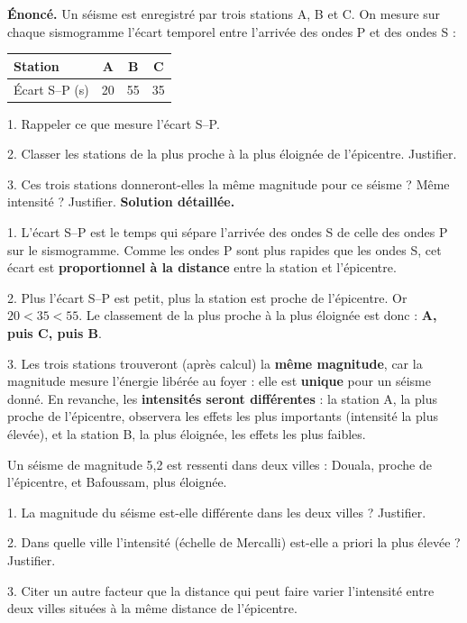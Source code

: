 \documentclass[11pt]{article}
\begin{document}
\begin{exoresolu}
\textbf{Énoncé.} Un séisme est enregistré par trois stations A, B et C. On mesure sur chaque sismogramme l'écart temporel entre l'arrivée des ondes P et des ondes S :
\begin{center}
\begin{tabular}{|l|c|c|c|}
\hline
\rowcolor{popblueL} \textbf{Station} & A & B & C \\
\hline
Écart S--P (s) & 20 & 55 & 35 \\
\hline
\end{tabular}
\end{center}
1. Rappeler ce que mesure l'écart S--P.\par
2. Classer les stations de la plus proche à la plus éloignée de l'épicentre. Justifier.\par
3. Ces trois stations donneront-elles la même magnitude pour ce séisme ? Même intensité ? Justifier.
\tcblower
\textbf{Solution détaillée.}\par
1. L'écart S--P est le temps qui sépare l'arrivée des ondes S de celle des ondes P sur le sismogramme. Comme les ondes P sont plus rapides que les ondes S, cet écart est \textbf{proportionnel à la distance} entre la station et l'épicentre.\par
2. Plus l'écart S--P est petit, plus la station est proche de l'épicentre. Or $20 < 35 < 55$. Le classement de la plus proche à la plus éloignée est donc : \textbf{A, puis C, puis B}.\par
3. Les trois stations trouveront (après calcul) la \textbf{même magnitude}, car la magnitude mesure l'énergie libérée au foyer : elle est \textbf{unique} pour un séisme donné. En revanche, les \textbf{intensités seront différentes} : la station A, la plus proche de l'épicentre, observera les effets les plus importants (intensité la plus élevée), et la station B, la plus éloignée, les effets les plus faibles.
\end{exoresolu}

\begin{exercice}
Un séisme de magnitude 5,2 est ressenti dans deux villes : Douala, proche de l'épicentre, et Bafoussam, plus éloignée.\par
1. La magnitude du séisme est-elle différente dans les deux villes ? Justifier.\par
2. Dans quelle ville l'intensité (échelle de Mercalli) est-elle a priori la plus élevée ? Justifier.\par
3. Citer un autre facteur que la distance qui peut faire varier l'intensité entre deux villes situées à la même distance de l'épicentre.
\end{exercice}
\end{document}
